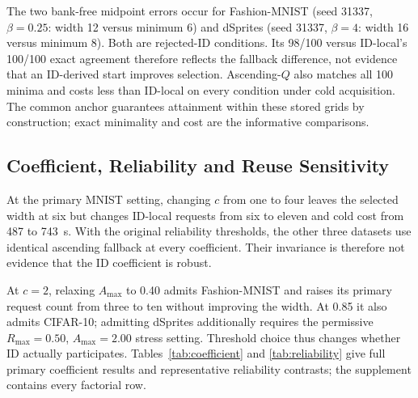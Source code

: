 \documentclass[make,article,submit,pdftex,moreauthors]{Definitions/mdpi}
\begin{document}
The two bank-free midpoint errors occur for Fashion-MNIST
(seed 31337, $\beta=0.25$: width 12 versus minimum 6) and dSprites
(seed 31337, $\beta=4$: width 16 versus minimum 8). Both are rejected-ID
conditions. Its 98/100 versus ID-local's 100/100 exact agreement therefore
reflects the fallback difference, not evidence that an ID-derived start
improves selection. Ascending-$Q$ also matches all 100 minima and costs
less than ID-local on every condition under cold acquisition. The common
anchor guarantees attainment within these stored grids by construction;
exact minimality and cost are the informative comparisons.

\subsection{Coefficient, Reliability and Reuse Sensitivity}\label{sec:idsensitivity}
At the primary MNIST setting, changing $c$ from one to four leaves the
selected width at six but changes ID-local requests from six to eleven
and cold cost from 487 to 743~s. With the original reliability thresholds,
the other three datasets use identical ascending fallback at every
coefficient. Their invariance is therefore not evidence that the ID
coefficient is robust.

At $c=2$, relaxing $A_{\max}$ to 0.40 admits Fashion-MNIST and raises its
primary request count from three to ten without improving the width.
At 0.85 it also admits CIFAR-10; admitting dSprites additionally requires
the permissive $R_{\max}=0.50$, $A_{\max}=2.00$ stress setting.
Threshold choice thus changes whether ID actually participates.
Tables~\ref{tab:coefficient} and \ref{tab:reliability} give full primary
coefficient results and representative reliability contrasts; the
supplement contains every factorial row.
\end{document}
